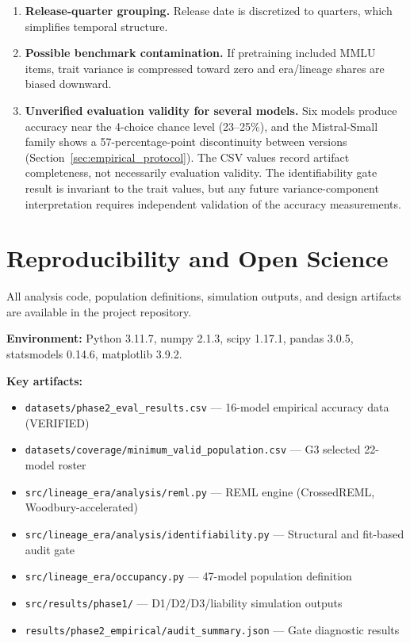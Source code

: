 \documentclass[journal]{IEEEtran}
\begin{document}
\begin{enumerate}[nosep]
\item \textbf{Release-quarter grouping.} Release date is discretized to quarters, which simplifies temporal structure.

\item \textbf{Possible benchmark contamination.} If pretraining included MMLU items, trait variance is compressed toward zero and era/lineage shares are biased downward.

\item \textbf{Unverified evaluation validity for several models.} Six models produce accuracy near the 4-choice chance level (23--25\%), and the Mistral-Small family shows a 57-percentage-point discontinuity between versions (Section~\ref{sec:empirical_protocol}). The CSV values record artifact completeness, not necessarily evaluation validity. The identifiability gate result is invariant to the trait values, but any future variance-component interpretation requires independent validation of the accuracy measurements.
\end{enumerate}

\section{Reproducibility and Open Science}
\label{sec:reproducibility}

All analysis code, population definitions, simulation outputs, and design artifacts are available in the project repository.

\textbf{Environment:} Python 3.11.7, numpy 2.1.3, scipy 1.17.1, pandas 3.0.5, statsmodels 0.14.6, matplotlib 3.9.2.

\textbf{Key artifacts:}
\begin{itemize}
\item \texttt{datasets/phase2\_eval\_results.csv} --- 16-model empirical accuracy data (VERIFIED)
\item \texttt{datasets/coverage/minimum\_valid\_population.csv} --- G3 selected 22-model roster
\item \texttt{src/lineage\_era/analysis/reml.py} --- REML engine (CrossedREML, Woodbury-accelerated)
\item \texttt{src/lineage\_era/analysis/identifiability.py} --- Structural and fit-based audit gate
\item \texttt{src/lineage\_era/occupancy.py} --- 47-model population definition
\item \texttt{src/results/phase1/} --- D1/D2/D3/liability simulation outputs
\item \texttt{results/phase2\_empirical/audit\_summary.json} --- Gate diagnostic results
\end{itemize}
\end{document}
